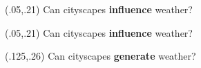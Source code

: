 \documentclass[
paper=128mm:96mm, %
fontsize=11pt, %
pagesize, %
parskip=half-, %
]{scrartcl}
\theoremstyle{mythmstyle} %
\begin{document}
\begin{textblock}{1}(.05,.21)
  \normalsize {Can cityscapes \textbf{influence} weather?}
\end{textblock}
 

\clearpage



 
\begin{textblock}{1}(.05,.21)
  \normalsize {Can cityscapes \textbf{influence} weather?}
\end{textblock}
 

\begin{textblock}{1}(.125,.26)
  \normalsize {Can cityscapes \textbf{generate} weather?}
\end{textblock}
 
  
\clearpage


\end{document}
